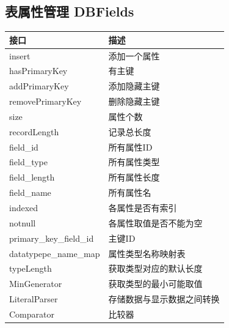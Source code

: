     \subsection{表属性管理 DBFields}
        \begin{tabularx}{\textwidth}{lX}
            \toprule
            接口 & 描述 \\
            \midrule
            insert & 添加一个属性 \\
            \midrule
            hasPrimaryKey & 有主键 \\
            \midrule
            addPrimaryKey & 添加隐藏主键 \\
            \midrule
            removePrimaryKey & 删除隐藏主键 \\
            \midrule
            size & 属性个数 \\
            \midrule
            recordLength & 记录总长度 \\
            \midrule
            field\_id & 所有属性ID \\
            \midrule
            field\_type & 所有属性类型 \\
            \midrule
            field\_length & 所有属性长度 \\
            \midrule
            field\_name & 所有属性名 \\
            \midrule
            indexed & 各属性是否有索引 \\
            \midrule
            notnull & 各属性取值是否不能为空 \\
            \midrule
            primary\_key\_field\_id & 主键ID \\
            \midrule
            datatypepe\_name\_map & 属性类型名称映射表 \\
            \midrule
            typeLength & 获取类型对应的默认长度 \\
            \midrule
            MinGenerator & 获取类型的最小可能取值 \\
            \midrule
            LiteralParser & 存储数据与显示数据之间转换 \\
            \midrule
            Comparator & 比较器 \\
            \bottomrule
        \end{tabularx}
